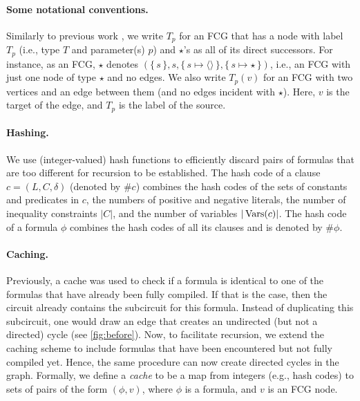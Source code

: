 \paragraph{Some notational conventions.}
Similarly to previous work \citep{DBLP:conf/ijcai/BroeckTMDR11}, we write $T_p$
for an FCG that has a node with label $T_p$ (i.e., type $T$ and parameter(s)
$p$) and $\star$'s as all of its direct successors. For instance, as an FCG,
$\star$ denotes
$(\{\, s \,\}, s, \{\, s \mapsto \langle\rangle \,\}, \{\, s \mapsto \star \,\})$,
i.e., an FCG with just one node of type $\star$ and no edges. We also write
$T_p(v)$ for an FCG with two vertices and an edge between them (and no edges
incident with $\star$). Here, $v$ is the target of the edge, and $T_p$ is the
label of the source.

\paragraph{Hashing.}
We use (integer-valued) hash functions to efficiently discard pairs of formulas
that are too different for recursion to be established. The hash code of a
clause $c = (L, C, \delta)$ (denoted by $\# c$) combines the hash codes of the
sets of constants and predicates in $c$, the numbers of positive and negative
literals, the number of inequality constraints $|C|$, and the number of
variables $|\operatorname{Vars}(c)|$. The hash code of a formula $\phi$ combines the hash
codes of all its clauses and is denoted by $\#\phi$.

\paragraph{Caching.}
Previously, a cache was used to check if a formula is identical to one of the
formulas that have already been fully compiled. If that is the case, then the
circuit already contains the subcircuit for this formula. Instead of duplicating
this subcircuit, one would draw an edge that creates an undirected (but not a
directed) cycle (see \cref{fig:before}). Now, to facilitate recursion, we extend
the caching scheme to include formulas that have been encountered but not fully
compiled yet. Hence, the same procedure can now create directed cycles in the
graph. Formally, we define a \emph{cache} to be a map from integers (e.g., hash
codes) to sets of pairs of the form $(\phi, v)$, where $\phi$ is a formula, and
$v$ is an FCG node.


